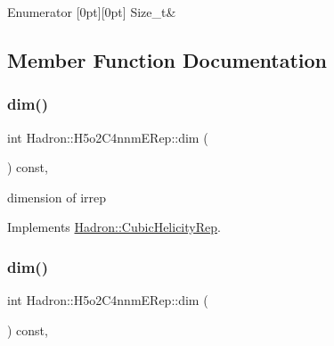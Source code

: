 \begin{DoxyEnumFields}{Enumerator}
[0pt][0pt]{}\mbox{\label{structHadron_1_1H5o2C4nnmERep_ae4c0ee2946270c0d760824c8d2c10bc4a8a34a0808edb034c43b5fbf015c7aa65}} 
Size\+\_\+t&\\
\hline

\end{DoxyEnumFields}


\subsection{Member Function Documentation}
\mbox{\label{structHadron_1_1H5o2C4nnmERep_accbf09b2922edd15ef55ad93a6d69777}} 
\subsubsection{\texorpdfstring{dim()}{dim()}\hspace{0.1cm}{\footnotesize\ttfamily [1/3]}}
{\footnotesize\ttfamily int Hadron\+::\+H5o2\+C4nnm\+E\+Rep\+::dim (\begin{DoxyParamCaption}{ }\end{DoxyParamCaption}) const\hspace{0.3cm}{\ttfamily [inline]}, {\ttfamily [virtual]}}

dimension of irrep 

Implements \mbox{\hyperlink{structHadron_1_1CubicHelicityRep_a95d229a05580e65f8bdde74a1e316855}{Hadron\+::\+Cubic\+Helicity\+Rep}}.

\mbox{\label{structHadron_1_1H5o2C4nnmERep_accbf09b2922edd15ef55ad93a6d69777}} 
\subsubsection{\texorpdfstring{dim()}{dim()}\hspace{0.1cm}{\footnotesize\ttfamily [2/3]}}
{\footnotesize\ttfamily int Hadron\+::\+H5o2\+C4nnm\+E\+Rep\+::dim (\begin{DoxyParamCaption}{ }\end{DoxyParamCaption}) const\hspace{0.3cm}{\ttfamily [inline]}, {\ttfamily [virtual]}}

